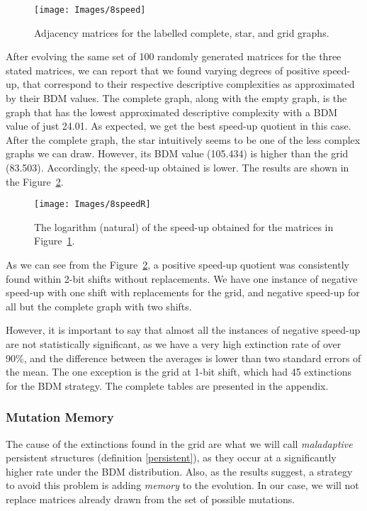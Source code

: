 \documentclass[10pt]{article}
\begin{document}
\begin{figure}[ht!]
    \centering
    \texttt{[image: Images/8speed]}
    \caption{Adjacency matrices for the labelled complete, star, and grid graphs. \label{8speed}}
\end{figure}

After evolving the same set of 100 randomly generated matrices for the three stated matrices, we can report that we found varying degrees of
positive speed-up, that correspond to their respective descriptive complexities as  approximated by their BDM values.
The complete graph, along with the empty graph, is the graph that has the lowest approximated descriptive complexity with a BDM value of just 24.01. As expected, we get the best speed-up quotient in this case. After the complete graph, the star intuitively seems to be one of the less complex graphs we can draw. However, its BDM value (105.434) is higher than the grid (83.503). Accordingly, the speed-up obtained is lower. The results are shown in the Figure~\ref{8speed2}.

\begin{figure}[ht!]
    \centering
    \texttt{[image: Images/8speedR]}
    \caption{The logarithm (natural) of the speed-up obtained for the matrices in Figure~\ref{8speed}. \label{8speed2}}
\end{figure}

As we can see from the Figure~\ref{8speed2}, a positive speed-up quotient was consistently found within 2-bit shifts without replacements. We have one instance of negative speed-up with one shift with replacements for the grid, and negative speed-up for all but the complete graph with two shifts.

However, it is important to say that almost all the instances of negative speed-up are not statistically significant, as we have a very high extinction rate of over 90\%, and the difference between the averages is lower than two standard errors of the mean. The one exception is the grid at 1-bit shift, which had 45 extinctions for the BDM strategy. The complete tables are presented in the appendix.

\subsubsection{Mutation Memory}\label{memory}

The cause of the extinctions found in the grid are what we will call  \textit{maladaptive} persistent structures (definition \ref{persistent}), as they occur at a significantly higher rate under the BDM distribution. Also, as the results suggest, a strategy to avoid this problem is adding \textit{memory} to the evolution. In our case, we will not replace matrices already drawn from the set of possible mutations.
\end{document}
